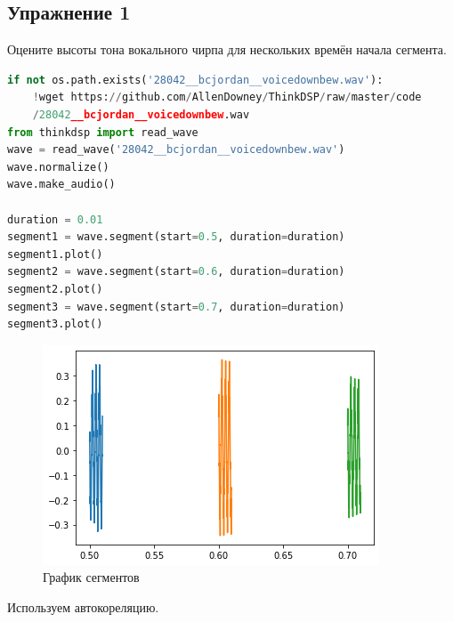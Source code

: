 \subsection{Упражнение 1}

Оцените высоты тона вокального чирпа для нескольких времён начала сегмента.

\begin{lstlisting}[language=Python]
if not os.path.exists('28042__bcjordan__voicedownbew.wav'):
    !wget https://github.com/AllenDowney/ThinkDSP/raw/master/code
    /28042__bcjordan__voicedownbew.wav
from thinkdsp import read_wave
wave = read_wave('28042__bcjordan__voicedownbew.wav')
wave.normalize()
wave.make_audio()

duration = 0.01
segment1 = wave.segment(start=0.5, duration=duration)
segment1.plot()
segment2 = wave.segment(start=0.6, duration=duration)
segment2.plot()
segment3 = wave.segment(start=0.7, duration=duration)
segment3.plot()
\end{lstlisting}
\begin{figure}[H]
	\begin{center}
		\includegraphics[scale=1]{fig/lab05/lab5_1.png}
		\caption{График сегментов}
	\end{center}
\end{figure}

Используем автокореляцию.

